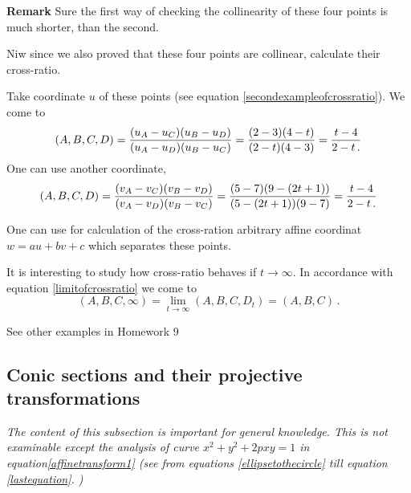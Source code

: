 \documentclass[12pt]{article}
\numberwithin{equation}{section}
\begin{document}
{\bf Remark} Sure the  first way of checking the  collinearity
of these four points 
is much shorter, than the second. 


  Niw since we also proved that these  four points are collinear,
 calculate their cross-ratio.

  Take coordinate $u$ of these points (see equation 
\eqref{secondexampleofcrossratio}). We come to
         $$
(A,B,C,D)=
{(u_A-u_C)(u_B-u_D)\over (u_A-u_D)(u_B-u_C)}=
{(2-3)(4-t)\over (2-t)(4-3)}={t-4\over 2-t\,.}
         $$
One can use another coordinate, 
   $$(A,B,C,D)=
{(v_A-v_C)(v_B-v_D)\over (v_A-v_D)(v_B-v_C)}=
{(5-7)(9-(2t+1))\over (5-(2t+1))(9-7)}={t-4\over 2-t\,.}
   $$
{\footnotesize One can use for calculation
of the cross-ration arbitrary affine coordinat
$w=au+bv+c$ which separates these points.

It is interesting to study how cross-ratio behaves
if $t\to \infty$. In accordance with equation \eqref{limitofcrossratio}
we come to
            $$
  (A,B,C,\infty)=\lim_{t\to \infty}(A,B,C,D_t)=(A,B,C)\,.
            $$
}


See other examples in Homework 9


\subsection {Conic sections and their projective 
transformations}

{\it The content of this subsection is important for general knowledge.
  This is not examinable except the analysis of 
  curve $x^2+y^2+2pxy=1$ in equation\eqref{affinetransform1}
    (see from equations \eqref{ellipsetothecircle} till equation \eqref{lastequation}.
  ) }

\end{document}
